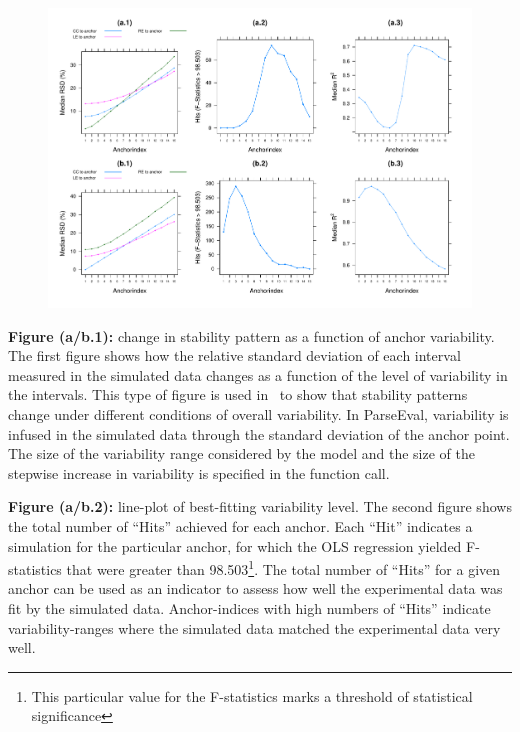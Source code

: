 \documentclass[
draft=false,
toc=graduated,
listof=totoc,
headsepline=true,
]%
{scrartcl}
\begin{document}
\begin{figure}[htb]
\begin{center}
\includegraphics[scale=.48]{./plots/diag_allh.pdf}
\end{center}
\label{pic:diag_exmp}
\end{figure}

\textbf{Figure (a/b.1):} change in stability pattern as a function of anchor variability. The first figure shows how the relative standard deviation of each interval measured in the simulated data changes as a function of the level of variability in the intervals.
This type of figure is used in~\textcite[][section 4.2]{Shaw2009} to show that stability patterns change under different conditions of overall variability.
In ParseEval, variability is infused in the simulated data through the standard deviation of the anchor point.
The size of the variability range considered by the model and the size of the stepwise increase in variability is specified in the function call.\par

\textbf{Figure (a/b.2):} line-plot of best-fitting variability level.
The second figure shows the total number of \enquote{Hits} achieved for each anchor. Each \enquote{Hit} indicates a simulation for the particular anchor, for which the OLS regression yielded F-statistics that were greater than 98.503\footnote{This particular value for the F-statistics marks a threshold of statistical significance}. The total number of \enquote{Hits} for a given anchor can be used as an indicator to assess how well the experimental data was fit by the simulated data. Anchor-indices with high numbers of \enquote{Hits} indicate variability-ranges where the simulated data matched the experimental data very well.\par
\end{document}
